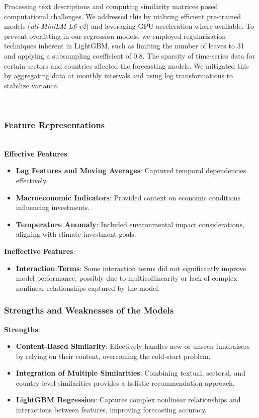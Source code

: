 \documentclass[sigconf]{acmart}
\begin{document}
Processing text descriptions and computing similarity matrices posed computational challenges. We addressed this by utilizing efficient pre-trained models (\textit{all-MiniLM-L6-v2}) and leveraging GPU acceleration where available. To prevent overfitting in our regression models, we employed regularization techniques inherent in LightGBM, such as limiting the number of leaves to 31 and applying a subsampling coefficient of 0.8. The sparsity of time-series data for certain sectors and countries affected the forecasting models. We mitigated this by aggregating data at monthly intervals and using log transformations to stabilize variance.

\mbox{}\\

\subsubsection{Feature Representations}\mbox{}\\

\textbf{Effective Features}:

\begin{itemize}
    \item \textbf{Lag Features and Moving Averages}: Captured temporal dependencies effectively.
    \item \textbf{Macroeconomic Indicators}: Provided context on economic conditions influencing investments.
    \item \textbf{Temperature Anomaly}: Included environmental impact considerations, aligning with climate investment goals.
\end{itemize}

\textbf{Ineffective Features}:

\begin{itemize}
    \item \textbf{Interaction Terms}: Some interaction terms did not significantly improve model performance, possibly due to multicollinearity or lack of complex nonlinear relationships captured by the model.
\end{itemize}

\subsubsection{Strengths and Weaknesses of the Models}

\textbf{Strengths}:

\begin{itemize}
    \item \textbf{Content-Based Similarity}: Effectively handles new or unseen fundraisers by relying on their content, overcoming the cold-start problem.
    \item \textbf{Integration of Multiple Similarities}: Combining textual, sectoral, and country-level similarities provides a holistic recommendation approach.
    \item \textbf{LightGBM Regression}: Captures complex nonlinear relationships and interactions between features, improving forecasting accuracy.
\end{itemize}
\end{document}
